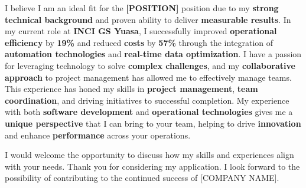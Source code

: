 \documentclass[11pt, a4paper]{awesome-cv}
\begin{document}
\begin{cvletter}
I believe I am an ideal fit for the \textbf{[POSITION]} position due to my \textbf{strong technical background} and proven ability to deliver \textbf{measurable results}. In my current role at \textbf{INCI GS Yuasa}, I successfully improved \textbf{operational efficiency} by \textbf{19\%} and reduced \textbf{costs} by \textbf{57\%} through the integration of \textbf{automation technologies} and \textbf{real-time data optimization}. I have a passion for leveraging technology to solve \textbf{complex challenges}, and my \textbf{collaborative approach} to project management has allowed me to effectively manage teams. This experience has honed my skills in \textbf{project management}, \textbf{team coordination}, and driving initiatives to successful completion. My experience with both \textbf{software development} and \textbf{operational technologies} gives me a \textbf{unique perspective} that I can bring to your team, helping to drive \textbf{innovation} and enhance \textbf{performance} across your operations.

I would welcome the opportunity to discuss how my skills and experiences align with your needs. Thank you for considering my application. I look forward to the possibility of contributing to the continued success of [COMPANY NAME].

\end{cvletter}

\makeletterclosing
{}
\end{document}
